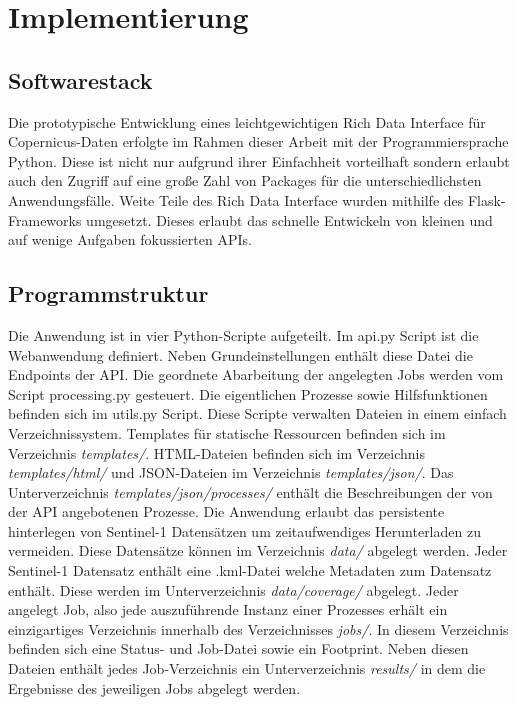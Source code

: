 \newpage
\restoregeometry
\section{Implementierung}
\subsection{Softwarestack}
Die prototypische Entwicklung eines leichtgewichtigen Rich Data Interface für Copernicus-Daten erfolgte im Rahmen dieser Arbeit mit der Programmiersprache Python.
Diese ist nicht nur aufgrund ihrer Einfachheit vorteilhaft sondern erlaubt auch den Zugriff auf eine große Zahl von Packages für die unterschiedlichsten 
Anwendungsfälle. 
Weite Teile des Rich Data Interface wurden mithilfe des Flask-Frameworks umgesetzt. Dieses erlaubt das schnelle Entwickeln von kleinen und auf wenige Aufgaben
fokussierten APIs.   

\subsection{Programmstruktur}
Die Anwendung ist in vier Python-Scripte aufgeteilt. Im api.py Script ist die Webanwendung definiert. Neben Grundeinstellungen enthält diese Datei
die Endpoints der API. Die geordnete Abarbeitung der angelegten Jobs werden vom Script processing.py gesteuert. Die eigentlichen Prozesse sowie 
Hilfsfunktionen befinden sich im utils.py Script.
Diese Scripte verwalten Dateien in einem einfach Verzeichnissystem. Templates für statische Ressourcen befinden sich im Verzeichnis \textit{templates/}. HTML-Dateien 
befinden sich im Verzeichnis \textit{templates/html/} und JSON-Dateien im Verzeichnis \textit{templates/json/}. Das Unterverzeichnis \textit{templates/json/processes/} enthält die 
Beschreibungen der von der API angebotenen Prozesse. Die Anwendung erlaubt das persistente hinterlegen von Sentinel-1 Datensätzen um zeitaufwendiges 
Herunterladen zu vermeiden. Diese Datensätze können im Verzeichnis \textit{data/} abgelegt werden. Jeder Sentinel-1 Datensatz enthält eine .kml-Datei welche 
Metadaten zum Datensatz enthält. Diese werden im Unterverzeichnis \textit{data/coverage/} abgelegt. 
Jeder angelegt Job, also jede auszuführende Instanz einer Prozesses erhält ein einzigartiges Verzeichnis innerhalb des Verzeichnisses \textit{jobs/}. In diesem 
Verzeichnis befinden sich eine Status- und Job-Datei sowie ein Footprint. Neben diesen Dateien enthält jedes Job-Verzeichnis ein Unterverzeichnis \textit{results/} in dem
die Ergebnisse des jeweiligen Jobs abgelegt werden.  

